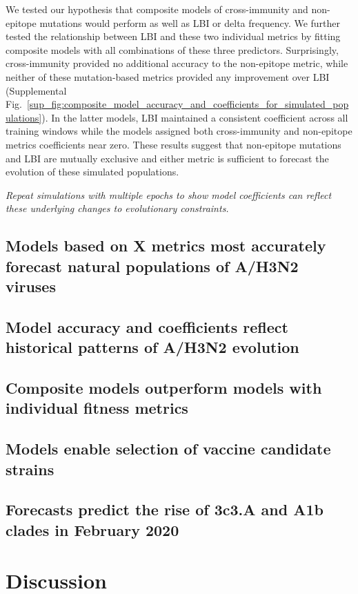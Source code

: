 We tested our hypothesis that composite models of cross-immunity and non-epitope mutations would perform as well as LBI or delta frequency.
We further tested the relationship between LBI and these two individual metrics by fitting composite models with all combinations of these three predictors.
Surprisingly, cross-immunity provided no additional accuracy to the non-epitope metric, while neither of these mutation-based metrics provided any improvement over LBI (Supplemental Fig.~\ref{sup_fig:composite_model_accuracy_and_coefficients_for_simulated_populations}).
In the latter models, LBI maintained a consistent coefficient across all training windows while the models assigned both cross-immunity and non-epitope metrics coefficients near zero.
These results suggest that non-epitope mutations and LBI are mutually exclusive and either metric is sufficient to forecast the evolution of these simulated populations.

\textit{Repeat simulations with multiple epochs to show model coefficients can reflect these underlying changes to evolutionary constraints.}

\subsection*{Models based on X metrics most accurately forecast natural populations of A/H3N2 viruses}

\subsection*{Model accuracy and coefficients reflect historical patterns of A/H3N2 evolution}

\subsection*{Composite models outperform models with individual fitness metrics}

\subsection*{Models enable selection of vaccine candidate strains}

\subsection*{Forecasts predict the rise of 3c3.A and A1b clades in February 2020}

\section*{Discussion}

